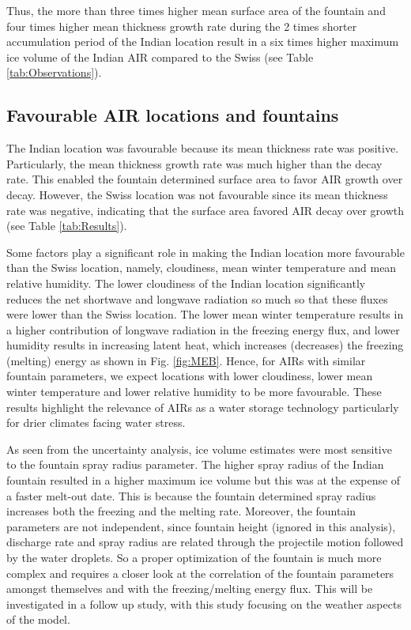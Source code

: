\documentclass[utf8]{frontiersSCNS}
\begin{document}
Thus, the more than three times higher mean surface area of the fountain and four times higher mean thickness
growth rate during the 2 times shorter accumulation period of the Indian location result in a six times
higher maximum ice volume of the Indian AIR compared to the Swiss (see Table \ref{tab:Observations}).

\subsection{Favourable AIR locations and fountains}

The Indian location was favourable because its mean thickness rate was positive. Particularly, the mean
thickness growth rate was much higher than the decay rate. This enabled the fountain determined surface area to
favor AIR growth over decay. However, the Swiss location was not favourable since its mean thickness rate was
negative, indicating that the surface area favored AIR decay over growth (see Table \ref{tab:Results}).

Some factors play a significant role in making the Indian location more favourable than the Swiss location,
namely, cloudiness, mean winter temperature and mean relative humidity. The lower cloudiness of the Indian
location significantly reduces the net shortwave and longwave radiation so much so that these fluxes were
lower than the Swiss location. The lower mean winter temperature results in a higher contribution of longwave
radiation in the freezing energy flux, and lower humidity results in increasing latent heat, which increases
(decreases) the freezing (melting) energy as shown in Fig. \ref{fig:MEB}. Hence, for AIRs with similar
fountain parameters, we expect locations with lower cloudiness, lower mean winter temperature and lower relative
humidity to be more favourable. These results highlight the relevance of AIRs as a water storage technology
particularly for drier climates facing water stress.

As seen from the uncertainty analysis, ice volume estimates were most sensitive to the fountain spray radius
parameter. The higher spray radius of the Indian fountain resulted in a higher maximum ice volume but this was
at the expense of a faster melt-out date. This is because the fountain determined spray radius increases both
the freezing and the melting rate. Moreover, the fountain parameters are not independent, since fountain height
(ignored in this analysis), discharge rate and spray radius are related through the projectile motion followed
by the water droplets. So a proper optimization of the fountain is much more complex and requires a closer look
at the correlation of the fountain parameters amongst themselves and with the freezing/melting energy flux. This
will be investigated in a follow up study, with this study focusing on the weather aspects of the model.
\end{document}
